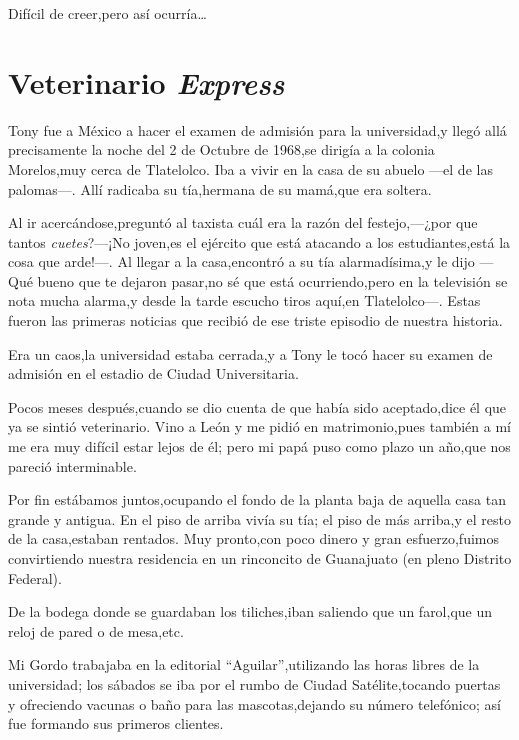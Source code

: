 \documentclass[letterpaper,12pt]{book}
\begin{document}
Difícil de creer,pero así ocurría\ldots

\chapter{Veterinario \textit{Express}}
Tony fue a México a hacer el examen de admisión para la universidad,y llegó allá precisamente la noche del 2 de Octubre de 1968,se dirigía a la colonia Morelos,muy cerca de Tlatelolco. Iba a vivir en la casa de su abuelo ---el de las palomas---. Allí radicaba su tía,hermana de su mamá,que era soltera. 

Al ir acercándose,preguntó al taxista cuál era la razón del festejo,---¿por que tantos \textit{cuetes}?---¡No joven,es el ejército que está atacando a los estudiantes,está la cosa que arde!---.
Al llegar a la casa,encontró a su tía alarmadísima,y le dijo ---Qué bueno que te dejaron pasar,no sé que está ocurriendo,pero en la televisión se nota mucha alarma,y desde la tarde escucho tiros aquí,en Tlatelolco---. Estas fueron las primeras noticias que recibió de ese triste episodio de nuestra historia. 

Era un caos,la universidad estaba cerrada,y a Tony le tocó hacer su examen de admisión en el estadio de Ciudad Universitaria. 

Pocos meses después,cuando se dio cuenta de que había sido aceptado,dice él que ya se sintió veterinario. Vino a León y me pidió en matrimonio,pues también a mí me era muy difícil estar lejos de él; pero mi papá puso como plazo un año,que nos pareció interminable.

Por fin estábamos juntos,ocupando el fondo de la planta baja de aquella casa tan grande y antigua. En el piso de arriba vivía su tía; el piso de más arriba,y el resto de la casa,estaban rentados. Muy pronto,con poco dinero y gran esfuerzo,fuimos convirtiendo nuestra residencia en un rinconcito de Guanajuato (en pleno Distrito Federal).

De la bodega donde se guardaban los tiliches,iban saliendo que un farol,que un reloj de pared o de mesa,etc.

Mi Gordo trabajaba en la editorial ``Aguilar'',utilizando las horas libres de la universidad; los sábados se iba por el rumbo de Ciudad Satélite,tocando puertas y ofreciendo vacunas o baño para las mascotas,dejando su número telefónico; así fue formando sus primeros clientes.
\end{document}
